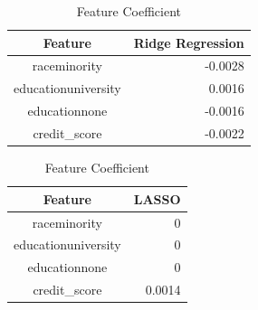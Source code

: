 \documentclass[a4paper, 11pt]{article}
\begin{document}
\begin{table}[ht]
	\centering
	\caption{Feature Coefficient}
	\label{table1}
	\begin{tabular}{c|r}
		\hline
		Feature & Ridge Regression \\ 
		\hline
		raceminority  & -0.0028 \\ 
		educationuniversity & 0.0016  \\ 
		educationnone       & -0.0016 \\ 
		credit\_score     & -0.0022 \\  
		\hline
	\end{tabular}
	\quad
		\begin{tabular}{c|r}
		\hline
		Feature & LASSO \\ 
		\hline
		raceminority  & 0 \\ 
		educationuniversity & 0  \\ 
		educationnone       & 0 \\ 
		credit\_score     & 0.0014 \\  
		\hline
	\end{tabular}
\end{table}
\end{document}
